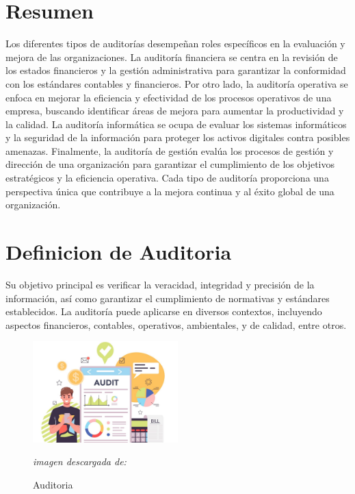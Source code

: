 \documentclass[12pt,a4paper]{article}
\begin{document}

\pagestyle{fancy} \mystyle \newpage %

\section{Resumen}
Los diferentes tipos de auditorías desempeñan roles específicos en la evaluación y mejora de las organizaciones. La auditoría financiera se centra en la revisión de los estados financieros y la gestión administrativa para garantizar la conformidad con los estándares contables y financieros. Por otro lado, la auditoría operativa se enfoca en mejorar la eficiencia y efectividad de los procesos operativos de una empresa, buscando identificar áreas de mejora para aumentar la productividad y la calidad. La auditoría informática se ocupa de evaluar los sistemas informáticos y la seguridad de la información para proteger los activos digitales contra posibles amenazas. Finalmente, la auditoría de gestión evalúa los procesos de gestión y dirección de una organización para garantizar el cumplimiento de los objetivos estratégicos y la eficiencia operativa. Cada tipo de auditoría proporciona una perspectiva única que contribuye a la mejora continua y al éxito global de una organización.

\newpage
\section{Definicion de Auditoria}
Su objetivo principal es verificar la veracidad, integridad y precisión de la información, así como garantizar el cumplimiento de normativas y estándares establecidos. La auditoría puede aplicarse en diversos contextos, incluyendo aspectos financieros, contables, operativos, ambientales, y de calidad, entre otros.

\begin{figure}[!htb]
    \centering
    \caption{Auditoria} 

    \includegraphics[width=0.5\textwidth]{images/audit_online_3.jpg}
    \par
    \textit{imagen descargada de:} \cite{img_auditoria}

\end{figure}
\end{document}
